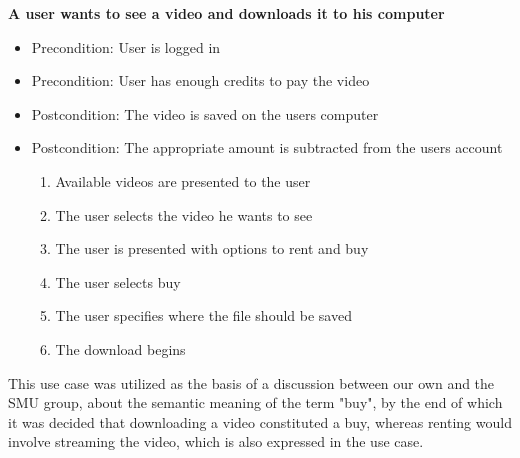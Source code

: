 \textbf{A user wants to see a video and downloads it to his computer}
\begin{itemize}
\item Precondition: User is logged in
\item Precondition: User has enough credits to pay the video
\item Postcondition: The video is saved on the users computer
\item Postcondition: The appropriate amount is subtracted from the users account
\begin{enumerate}
\item Available videos are presented to the user
\item The user selects the video he wants to see
\item The user is presented with options to rent and buy
\item The user selects buy
\item The user specifies where the file should be saved
\item The download begins
\end{enumerate}
\end{itemize}

This use case was utilized as the basis of a discussion between our own and the SMU group, about the semantic meaning of the term "buy", by the end of which it was decided that downloading a video constituted a buy, whereas renting would involve streaming the video, which is also expressed in the use case.

